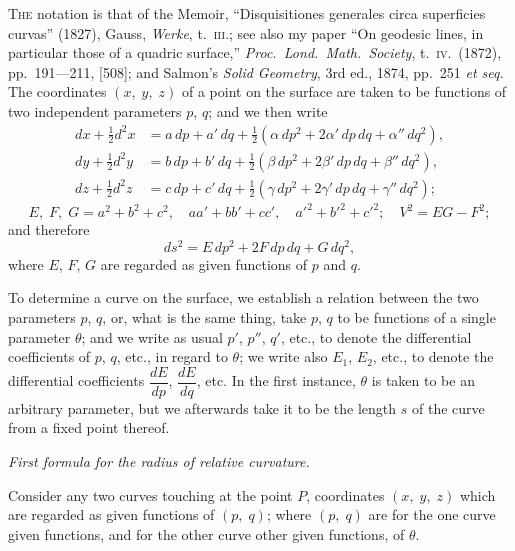 \documentclass[11pt,a4paper]{book}
\begin{document}
\textsc{The} notation is that of the Memoir, ``Disquisitiones generales circa superficies curvas'' (1827), Gauss, \textit{Werke}, t.\ \textsc{iii}.; see also my paper ``On geodesic lines, in particular those of a quadric surface,'' \textit{Proc.\ Lond.\ Math.\ Society}, t.\ \textsc{iv}.\ (1872), pp.\ 191---211, [508]; and Salmon's \textit{Solid Geometry}, 3rd ed., 1874, pp.\ 251 \textit{et seq.} The coordinates $(x,\; y,\; z)$ of a point on the surface are taken to be functions of two independent parameters $p$, $q$; and we then write
\begin{align*}
dx + \tfrac{1}{2}d^2x &= a\,dp + a'\,dq + \tfrac{1}{2}(\alpha\,dp^2 + 2\alpha'\,dp\,dq + \alpha''\,dq^2), \\
dy + \tfrac{1}{2}d^2y &= b\,dp + b'\,dq + \tfrac{1}{2}(\beta\,dp^2 + 2\beta'\,dp\,dq + \beta''\,dq^2), \\
dz + \tfrac{1}{2}d^2z &= c\,dp + c'\,dq + \tfrac{1}{2}(\gamma\,dp^2 + 2\gamma'\,dp\,dq + \gamma''\,dq^2);
\end{align*}
\[
E,\; F,\; G = a^2 + b^2 + c^2,\quad aa' + bb' + cc',\quad a'^2 + b'^2 + c'^2;\quad V^2 = EG - F^2;
\]
and therefore
\[
ds^2 = E\,dp^2 + 2F\,dp\,dq + G\,dq^2,
\]
where $E$, $F$, $G$ are regarded as given functions of $p$ and $q$.

To determine a curve on the surface, we establish a relation between the two parameters $p$, $q$, or, what is the same thing, take $p$, $q$ to be functions of a single parameter $\theta$; and we write as usual $p'$, $p''$, $q'$, etc., to denote the differential coefficients of $p$, $q$, etc., in regard to $\theta$; we write also $E_1$, $E_2$, etc., to denote the differential coefficients $\dfrac{dE}{dp}$, $\dfrac{dE}{dq}$, etc. In the first instance, $\theta$ is taken to be an arbitrary parameter, but we afterwards take it to be the length $s$ of the curve from a fixed point thereof.

\begin{center}
\textit{First formula for the radius of relative curvature.}
\end{center}

Consider any two curves touching at the point $P$, coordinates $(x,\; y,\; z)$ which are regarded as given functions of $(p,\; q)$; where $(p,\; q)$ are for the one curve given functions, and for the other curve other given functions, of $\theta$.
\end{document}
